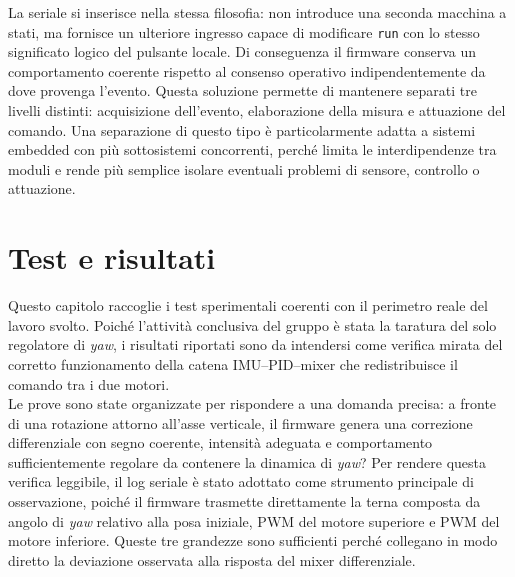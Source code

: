 \documentclass[11pt]{report}
\begin{document}
	
	
	La seriale si inserisce nella stessa filosofia: non introduce una seconda macchina a stati, ma fornisce un ulteriore ingresso capace di modificare \texttt{run} con lo stesso significato logico del pulsante locale. Di conseguenza il firmware conserva un comportamento coerente rispetto al consenso operativo indipendentemente da dove provenga l'evento. Questa soluzione permette di mantenere separati tre livelli distinti: acquisizione dell'evento, elaborazione della misura e attuazione del comando. Una separazione di questo tipo è particolarmente adatta a sistemi embedded con più sottosistemi concorrenti, perché limita le interdipendenze tra moduli e rende più semplice isolare eventuali problemi di sensore, controllo o attuazione.
	
	
	\chapter{Test e risultati}
	Questo capitolo raccoglie i test sperimentali coerenti con il perimetro reale del lavoro svolto. Poiché l'attività conclusiva del gruppo è stata la taratura del solo regolatore di \textit{yaw}, i risultati riportati sono da intendersi come verifica mirata del corretto funzionamento della catena IMU--PID--mixer che redistribuisce il comando tra i due motori.\\
	Le prove sono state organizzate per rispondere a una domanda precisa: a fronte di una rotazione attorno all'asse verticale, il firmware genera una correzione differenziale con segno coerente, intensità adeguata e comportamento sufficientemente regolare da contenere la dinamica di \textit{yaw}? Per rendere questa verifica leggibile, il log seriale è stato adottato come strumento principale di osservazione, poiché il firmware trasmette direttamente la terna composta da angolo di \textit{yaw} relativo alla posa iniziale, PWM del motore superiore e PWM del motore inferiore. Queste tre grandezze sono sufficienti perché collegano in modo diretto la deviazione osservata alla risposta del mixer differenziale.\\
\end{document}
